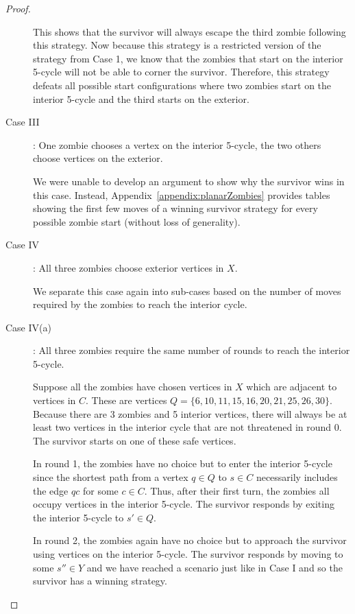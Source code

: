 \begin{proof}
\begin{description}
This shows that the survivor will always escape the third zombie following this strategy. Now because this strategy is a restricted version of the strategy from
Case 1, we know that the zombies that start on the interior 5-cycle will not be able to corner the survivor. Therefore, this strategy defeats all possible
start configurations where two zombies start on the interior 5-cycle and the third starts on the exterior.

\item[Case III\label{planar case 3}]: One zombie chooses a vertex on the interior 5-cycle, the two others choose vertices on the exterior.

We were unable to develop an argument to  show why the survivor wins in this case.
Instead, Appendix~\ref{appendix:planarZombies} provides tables showing the first few moves of a winning survivor strategy
for every possible zombie start (without loss of generality).

\item[Case IV \label{planar case 4}]: All three zombies choose exterior vertices in $X$.

We separate this case again into sub-cases based on the number of moves required
by the zombies to reach the interior cycle.

\item[Case IV(a)]: All three zombies require the same number of rounds to reach the interior 5-cycle.

Suppose all the zombies have chosen vertices in $X$ which are adjacent to vertices in $C$. These are vertices $Q = \{6, 10, 11, 15, 16, 20, 21, 25, 26, 30 \}$.
Because there are 3 zombies and 5 interior vertices, there will always be at least two vertices in the interior cycle that are not threatened in
round 0. The survivor starts on one of these safe vertices.

In round 1, the zombies have no choice but to enter the interior 5-cycle since the shortest path from a vertex $q \in Q$ to
$s \in C$ necessarily includes the edge $qc$ for some $c \in C$. Thus, after their first turn, the zombies all occupy vertices in the interior 5-cycle.
The survivor responds by exiting the interior 5-cycle to $s' \in Q$.

In round 2, the zombies again have no choice but to approach the survivor using vertices on the interior 5-cycle. The survivor responds by moving to
some $s'' \in Y$ and we have reached a scenario just like in Case I and so the survivor has a winning strategy.


\end{description}
\end{proof}
